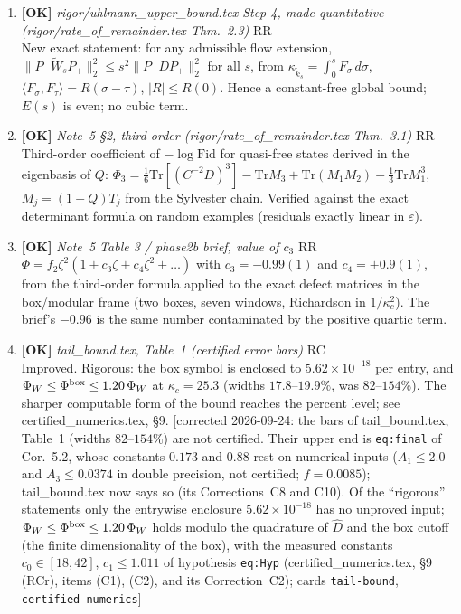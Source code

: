 \documentclass[11pt]{article}
\begin{document}
\begin{enumerate}[leftmargin=1.6em,itemsep=6pt]
\item \textbf{[OK]} \emph{rigor/uhlmann\_upper\_bound.tex Step 4, made quantitative (rigor/rate\_of\_remainder.tex Thm.~2.3)} \hfill\textsc{RR}\\ New exact statement: for any admissible flow extension, \(\lVert P_-\widetilde W_sP_+\rVert_2^2\le s^2\lVert P_-DP_+\rVert_2^2\) for all \(s\), from \(\kappa_{\tilde k_s}=\int_0^s F_\sigma\,d\sigma\), \(\langle F_\sigma,F_\tau\rangle=R(\sigma-\tau)\), \(|R|\le R(0)\). Hence a constant-free global bound; \(E(s)\) is even; no cubic term.
\item \textbf{[OK]} \emph{Note~5 \S2, third order (rigor/rate\_of\_remainder.tex Thm.~3.1)} \hfill\textsc{RR}\\ Third-order coefficient of \(-\log\mathrm{Fid}\) for quasi-free states derived in the eigenbasis of \(Q\): \(\Phi_3=\tfrac16\mathrm{Tr}[(C^{-2}D)^3]-\mathrm{Tr}M_3+\mathrm{Tr}(M_1M_2)-\tfrac13\mathrm{Tr}M_1^3\), \(M_j=(1-Q)T_j\) from the Sylvester chain. Verified against the exact determinant formula on random examples (residuals exactly linear in \(\varepsilon\)).
\item \textbf{[OK]} \emph{Note~5 Table 3 / phase2b brief, value of \(c_3\)} \hfill\textsc{RR}\\ \(\Phi=f_2\zeta^2(1+c_3\zeta+c_4\zeta^2+\dots)\) with \(c_3=-0.99(1)\) and \(c_4=+0.9(1)\), from the third-order formula applied to the exact defect matrices in the box/modular frame (two boxes, seven windows, Richardson in \(1/\kappa_c^2\)). The brief's \(-0.96\) is the same number contaminated by the positive quartic term.
\item \textbf{[OK]} \emph{tail\_bound.tex, Table~1 (certified error bars)} \hfill\textsc{RC}\\ Improved. Rigorous: the box symbol is enclosed to $5.62\times10^{-18}$ per entry, and $\Phi_W\le\Phi^{\rm box}\le1.20\,\Phi_W$ at $\kappa_c=25.3$ (widths $17.8$--$19.9\%$, was $82$--$154\%$). The sharper computable form of the bound reaches the percent level; see certified\_numerics.tex, \S9. [corrected 2026-09-24: the bars of tail\_bound.tex, Table~1 (widths \(82\)--\(154\%\)) are not certified. Their upper end is \texttt{eq:final} of Cor.~5.2, whose constants \(0.173\) and \(0.88\) rest on numerical inputs (\(A_1\le2.0\) and \(A_3\le0.0374\) in double precision, not certified; \(f=0.0085\)); tail\_bound.tex now says so (its Corrections~C8 and C10). Of the ``rigorous'' statements only the entrywise enclosure \(5.62\times10^{-18}\) has no unproved input; \(\Phi_W\le\Phi^{\rm box}\le1.20\,\Phi_W\) holds modulo the quadrature of \(\widehat D\) and the box cutoff (the finite dimensionality of the box), with the measured constants \(c_0\in[18,42]\), \(c_1\le1.011\) of hypothesis \texttt{eq:Hyp} (certified\_numerics.tex, \S9 (RCr), items (C1), (C2), and its Correction~C2); cards \texttt{tail-bound}, \texttt{certified-numerics}]

\end{enumerate}
\end{document}
